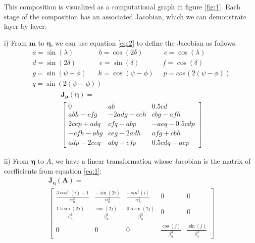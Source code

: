 \documentclass[preprint]{seismica}
\begin{document}
    \noindent This composition is visualized as a computational graph in figure \ref{fig:1}.
    Each stage of the composition has an associated Jacobian, which we can demonstrate layer by layer:
    
    i) From $\bm{m}$ to $\bm{\eta}$, we can use equation \ref{eq:2} to define the Jacobian
    as follows:
    \begin{align*}
      &a = \sin(\lambda)\;\;\;\;\;\;\;\;\;\;\;\;\; b = \cos(2\delta)\;\;\;\;\;\;\;\;\;\;\; c = \cos(\lambda)\\
      &d = \sin(2\delta)\;\;\;\;\;\;\;\;\;\;\;\; e = \sin(\delta)\;\;\;\;\;\;\;\;\;\;\;\; f = \cos(\delta)\\
      &g = \sin(\psi - \phi)\;\;\;\;\;\; h = \cos(\psi - \phi)\;\;\;\;\; p = cos(2(\psi - \phi))\\
      &q = \sin(2(\psi - \phi))
    \end{align*}
    \begin{align} \label{eq:19}
      \nonumber&\bm{J_p}(\bm{\eta}) = \\
      &\begin{bmatrix}
        0         &ab         &0.5cd\\
        abh-cfg   &-2adg-ceh  &cbg-afh\\
        2cep+adq  &cfq-abp    &-aeq-0.5cdp\\
        -cfh-abg  &ceg-2adh   &afg+cbh\\
        adp-2ceq  &abq+cfp    &0.5cdq-aep
      \end{bmatrix}
    \end{align}

    ii) From $\bm{\eta}$ to $A$, we have a linear transformation whose Jacobian is the matrix
    of coefficients from equation \ref{eq:1}:
    \begin{align} \label{eq:20}
      \nonumber&\bm{J_\eta}(\bm{A}) = \\
      &\begin{bmatrix}
        \frac{3\cos^2(i)-1}{\alpha_h^3}    &\frac{-\sin(2i)}{\alpha_h^3}    &\frac{-sin^2(i)}{\alpha_h^3}   &0    &0\\
        \frac{1.5\sin(2j)}{\beta_h^3}      &\frac{\cos(2j)}{\beta_h^3}      &\frac{0.5\sin(2j)}{\beta_h^3}  &0    &0\\
        0         &0           &0        &\frac{\cos(j)}{\beta_h^3}       &\frac{\sin(j)}{\beta_h^3}
      \end{bmatrix}
    \end{align}
\end{document}
